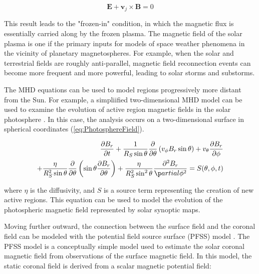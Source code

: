 \documentclass{article}
\begin{document}
\begin{equation}
    \mathbf E + \mathbf v_j \times \mathbf B = 0
    \label{eq:IdealMHDOhmLaw}
\end{equation}

\noindent This result leads to the "frozen-in" condition, in which the magnetic flux is essentially carried along by the frozen plasma. The magnetic field of the solar plasma is one if the primary inputs for models of space weather phenomena in the vicinity of planetary magnetospheres. For example, when the solar and terrestrial fields are roughly anti-parallel, magnetic field reconnection events can become more frequent and more powerful, leading to solar storms and substorms.

The MHD equations can be used to model regions progressively more distant from the Sun. For example, a simpliified two-dimensional MHD model can be used to examine the evolution of active region magnetic fields in the solar photosphere \cite{russell2016}. In this case, the analysis occurs on a two-dimensional surface in spherical coordinates (\ref{eq:PhotosphereField}).

\begin{equation}
\begin{split}
    \frac {\partial B_r} {\partial t} + \frac {1} {R_S \sin \theta} \frac {\partial} {\partial \theta} \left( v_{\phi} B_r \sin \theta \right) + v_{\theta} \frac {\partial B_r} {\partial \phi} \\
    + \frac {\eta} {R_S^2 \sin \theta} \frac {\partial} {\partial \theta} \left( \sin \theta \frac {\partial B_r} {\partial \theta} \right) + \frac {\eta} {R_S^2 \sin^2 \theta} \frac {\partial^2 B_r} {\p artial \phi^2} = S(\theta, \phi, t)
    \label{eq:PhotosphereField}
\end{split}
\end{equation}

\noindent where $\eta$ is the diffusivity, and $S$ is a source term representing the creation of new active regions. This equation can be used to model the evolution of the photospheric magnetic field represented by solar synoptic maps.

Moving further outward, the connection between the surface field and the coronal field can be modeled with the potential field source surface (PFSS) model \cite{Altschuler1969}. The PFSS model is a conceptually simple model used to estimate the solar coronal magnetic field from observations of the surface magnetic field. In this model, the static coronal field is derived from a scalar magnetic potential field:
\end{document}
